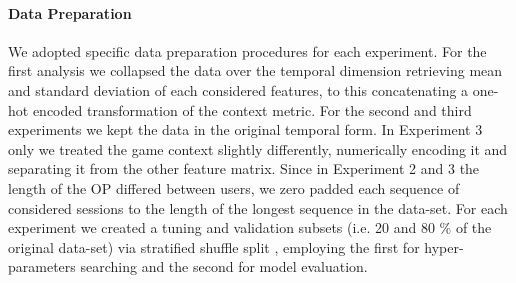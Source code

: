 \begin{table}[h] \centering
\caption{\textbf{Considered Metrics over Sessions}}
\label{metricsdescription}
\end{table}

\paragraph*{Data Preparation}We adopted specific data preparation procedures for each experiment. For the first analysis we collapsed the data over the temporal dimension retrieving mean and standard deviation of each considered features, to this concatenating a one-hot encoded transformation of the context metric. For the second and third experiments we kept the data in the original temporal form. In Experiment 3 only we treated the game context slightly differently, numerically encoding it and separating it from the other feature matrix. Since in Experiment 2 and 3 the length of the OP differed between users, we zero padded each sequence of considered sessions to the length of the longest sequence in the data-set. For each experiment we created a tuning and validation subsets (i.e. 20 and 80 \% of the original data-set) via stratified shuffle split \cite{scikit-learn}, employing the first for hyper-parameters searching and the second for model evaluation.

